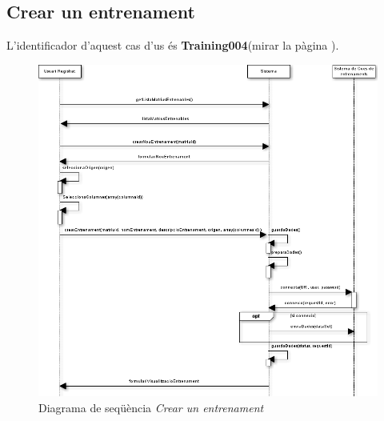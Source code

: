 \subsection*{Crear un entrenament}
L'identificador d'aquest cas d'us \'{e}s \textbf{Training004}(mirar la p\`{a}gina \pageref{training004}).
\begin{figure}[H]
  \centering
  \includegraphics[scale=0.5]{img/specification/SequenceCreateTraining.png}
  \caption{Diagrama de seqüència \textit{Crear un entrenament}}
  \label{fig:sequenceaddtraining}
\end{figure}

